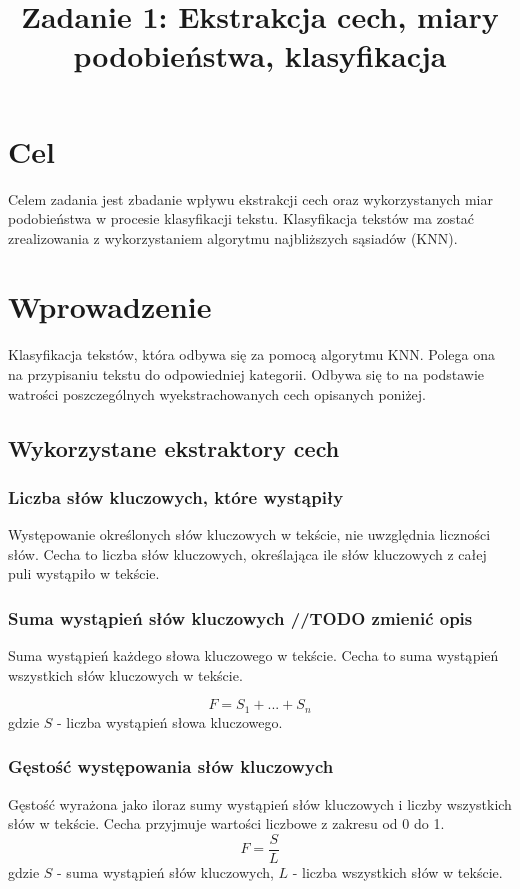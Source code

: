 \documentclass{classrep}
\author{
  \studentinfo{Konrad Jachimstal}{211807} \and
  \studentinfo{ Patryk Janicki}{211951}
}
\title{Zadanie 1: Ekstrakcja cech, miary podobieństwa, klasyfikacja}
\begin{document}
\maketitle

\section{Cel}
{Celem zadania jest zbadanie wpływu ekstrakcji cech oraz wykorzystanych miar podobieństwa w procesie klasyfikacji tekstu. 
Klasyfikacja tekstów ma zostać zrealizowania z wykorzystaniem algorytmu najbliższych sąsiadów (KNN).}

\section{Wprowadzenie}
Klasyfikacja tekstów, która odbywa się za pomocą algorytmu KNN. Polega ona na przypisaniu tekstu do odpowiedniej
kategorii. Odbywa się to na podstawie watrości poszczególnych wyekstrachowanych cech opisanych poniżej.
\subsection{Wykorzystane ekstraktory cech}

\subsubsection{Liczba słów kluczowych, które wystąpiły}
Występowanie określonych słów kluczowych w tekście,
nie uwzględnia liczności słów. Cecha to liczba słów kluczowych,
określająca ile słów kluczowych z całej puli wystąpiło w tekście.

\subsubsection{Suma wystąpień słów kluczowych //TODO zmienić opis}
Suma wystąpień każdego słowa kluczowego w tekście. Cecha to suma wystąpień wszystkich słów kluczowych w tekście.

\begin{equation}
    F=S_{1} + ... + S_{n}
\end{equation}
gdzie $S$ - liczba wystąpień słowa kluczowego.


\subsubsection{Gęstość występowania słów kluczowych}
Gęstość wyrażona jako iloraz sumy wystąpień słów kluczowych i liczby wszystkich słów w tekście.
Cecha przyjmuje wartości liczbowe z zakresu od 0 do 1.
    \begin{equation}
      F=\frac{S}{L}
    \end{equation}
gdzie $S$ - suma wystąpień słów kluczowych, $L$ - liczba wszystkich słów w tekście.
\end{document}
